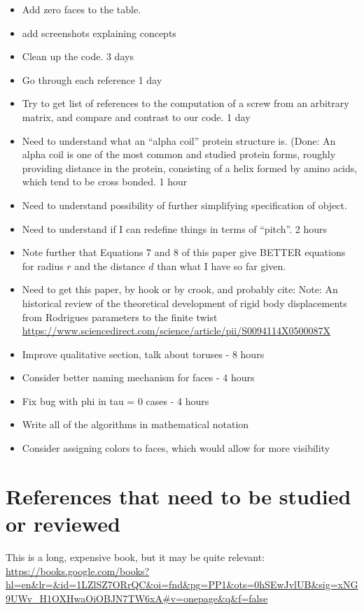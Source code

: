 \documentclass[11pt]{article}
\begin{document}
{\begin{itemize}
  \item Add zero faces to the table.
\item{add screenshots explaining concepts}
\item Clean up the code. 3 days
\item Go through each reference 1 day
\item Try to get list of references to the computation of a screw from an arbitrary matrix, and compare and contrast to our code. 1 day
\item Need to understand what an ``alpha coil'' protein structure is. (Done: An alpha coil is one of the most common
and studied protein forms, roughly providing distance in the protein, consisting of a helix formed by
amino acids, which tend to be cross bonded. 1 hour
\item Need to understand possibility of further simplifying specification of object.
\item Need to understand if I can redefine things in terms of ``pitch''. 2 hours
\item Note further that Equations 7 and 8 of this paper\cite{kahn1989defining} give BETTER equations for radius $r$ and the distance $d$ than what I have so far given.
\item Need to get this paper, by hook or by crook, and probably cite:
  Note: An historical review of the theoretical development of rigid body displacements from Rodrigues parameters to the finite twist
  \url{https://www.sciencedirect.com/science/article/pii/S0094114X0500087X}
  \item Improve qualitative section, talk about toruses - 8 hours
  \item Consider better naming mechanism for faces - 4 hours
  \item Fix bug with phi in tau = 0 cases - 4 hours
  \item Write all of the algorithms in mathematical notation
  \item Consider assigning colors to faces, which would allow for more visibility
  \end{itemize}

\section{References that need to be studied or reviewed}

This is a long, expensive book, but it may be quite relevant\cite{hyde1996language}:
\url{https://books.google.com/books?hl=en&lr=&id=1LZlSZ7ORrQC&oi=fnd&pg=PP1&ots=0hSEwJvlUB&sig=xNG9UWv_H1OXHwaOiOBJN7TW6xA#v=onepage&q&f=false}

}
\end{document}
